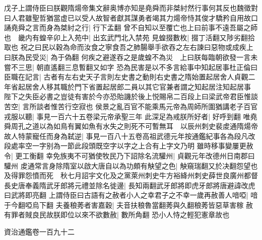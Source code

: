 戊子上謂侍臣曰朕觀隋煬帝集文辭奥博亦知是堯舜而非桀紂然行事何其反也魏徵對曰人君雖聖哲猶當虚已以受人故智者獻其謀勇者竭其力煬帝恃其俊才驕矜自用故口誦堯舜之言而身為桀紂之行|{
	行下孟翻}
曾不自知以至覆亡也上曰前事不遠吾屬之師也　畿内有蝗辛卯上入苑中|{
	出玄武門北入禁苑}
見蝗掇數枚|{
	掇丁活翻又陟劣翻拾取也}
祝之曰民以穀為命而汝食之寧食吾之肺腸舉手欲吞之左右諫曰惡物或成疾上曰朕為民受災|{
	為于偽翻}
何疾之避遂吞之是歲蝗不為災　上曰朕每臨朝欲發一言未嘗不三思|{
	朝直遙翻三息暫翻又如字}
恐為民害是以不多言給事中知起居事杜正倫曰臣職在記言|{
	古者有左右史天子言則左史書之動則右史書之隋始置起居舍人貞觀二年省起居舍人移其職於門下省置起居郎二員以其它官兼者謂之知起居注知起居事}
陛下之失臣必書之豈徒有害於今亦恐貽譏於後上悦賜帛二百段上曰梁武帝君臣惟談苦空|{
	言所談者惟苦行空寂也}
侯景之亂百官不能乘馬元帝為周師所圍猶講老子百官戎服以聽|{
	事見一百六十五卷梁元帝承聖三年}
此深足為戒朕所好者|{
	好呼到翻}
唯堯舜周孔之道以為如鳥有翼如魚有水失之則死不可暫無耳　以辰州刺史裴䖍通隋煬帝故人特蒙寵任而身為弑逆|{
	事見一百八十五卷高祖武德元年按通鑑紀事各為段凡改段處率空一字别為一節此段頭既空字以字之上合有上字文乃明}
雖時移事變屢更赦令|{
	更工衡翻}
幸免族夷不可猶使牧民乃下詔除名流驩州|{
	貞觀元年改德州日南郡曰驩州}
䖍通常言身除隋室以啟大唐自以為功頗有觖望之色|{
	觖窺瑞翻又於决翻怨望也}
及得罪怨憤而死　秋七月詔宇文化及之黨萊州刺史牛方裕絳州刺史薛世良廣州都督長史唐奉義隋武牙郎將元禮並除名徙邊|{
	長知兩翻武牙郎將即虎牙郎將唐避諱改虎曰武將即亮翻}
上謂侍臣曰古語有之赦者小人之幸君子之不幸一歲再赦善人喑啞|{
	喑于今翻啞烏下翻}
夫養稂莠者害嘉穀|{
	夫音扶稂魯當翻莠與久翻稂莠皆惡草害稼}
赦有罪者賊良民故朕即位以來不欲數赦|{
	數所角翻}
恐小人恃之輕犯憲章故也

資治通鑑卷一百九十二
